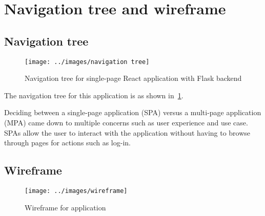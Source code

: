 \clearpage


\section{Navigation tree and wireframe}\label{sec:navigation-tree-and-wireframe}

\subsection{Navigation tree}

\begin{figure}[h]
    \centering
    \texttt{[image: ../images/navigation tree]}
    \caption{Navigation tree for single-page React application with Flask backend}
    \label{fig:navigationTree}
\end{figure}

The navigation tree for this application is as shown in~\ref{fig:navigationTree}.

Deciding between a single-page application (SPA) versus a multi-page application (MPA) came down to multiple concerns such as user experience and use case.
SPAs allow the user to interact with the application without having to browse through pages for actions such as log-in.


\subsection{Wireframe}\label{subsec:wireframe}

\begin{figure}
    \centering
    \texttt{[image: ../images/wireframe]}
    \caption{Wireframe for application}
    \label{fig:wireframe}
\end{figure}

